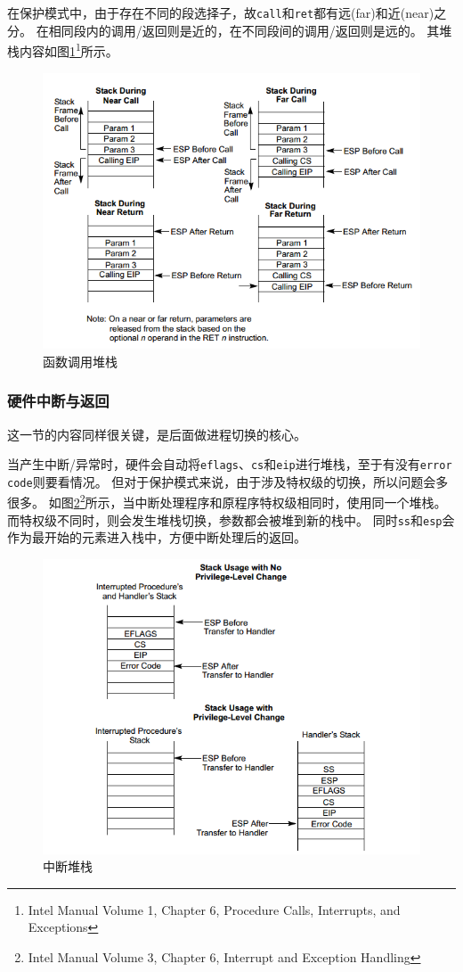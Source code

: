 \documentclass[logo,reportComp]{thesis}
\begin{document}
在保护模式中，由于存在不同的段选择子，故\verb'call'和\verb'ret'都有远(far)和近(near)之分。
在相同段内的调用/返回则是近的，在不同段间的调用/返回则是远的。
其堆栈内容如图\ref{fig:call_stack}\footnote{Intel Manual Volume 1, Chapter 6, Procedure Calls, Interrupts, and Exceptions}所示。
\begin{figure}[H]
\centering
\includegraphics[width=0.7\linewidth]{fig/call.PNG}
\caption{函数调用堆栈}
\label{fig:call_stack}
\end{figure}

\subsubsection{硬件中断与返回}
这一节的内容同样很关键，是后面做进程切换的核心。

当产生中断/异常时，硬件会自动将\verb'eflags'、\verb'cs'和\verb'eip'进行堆栈，至于有没有\verb'error code'则要看情况。
但对于保护模式来说，由于涉及特权级的切换，所以问题会多很多。
如图\ref{fig:interrupt-stack}\footnote{Intel Manual Volume 3, Chapter 6, Interrupt and Exception Handling}所示，当中断处理程序和原程序特权级相同时，使用同一个堆栈。
而特权级不同时，则会发生堆栈切换，参数都会被堆到新的栈中。
同时\verb'ss'和\verb'esp'会作为最开始的元素进入栈中，方便中断处理后的返回。
\begin{figure}[H]
\centering
\includegraphics[width=0.7\linewidth]{fig/interrupt-stack.PNG}
\caption{中断堆栈}
\label{fig:interrupt-stack}
\end{figure}
\end{document}

